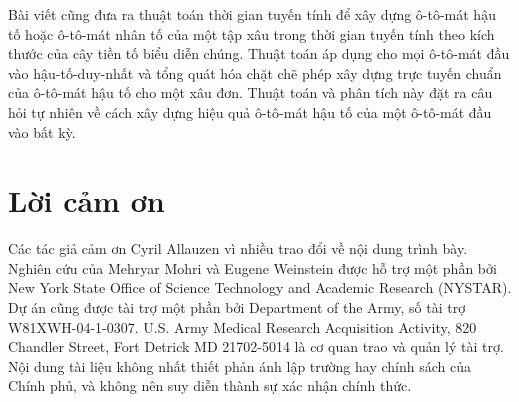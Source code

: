 \documentclass[11pt]{article}
\begin{document}
Bài viết cũng đưa ra thuật toán thời gian tuyến tính để xây dựng ô-tô-mát hậu
tố hoặc ô-tô-mát nhân tố của một tập xâu trong thời gian tuyến tính theo kích
thước của cây tiền tố biểu diễn chúng. Thuật toán áp dụng cho mọi ô-tô-mát đầu
vào hậu-tố-duy-nhất và tổng quát hóa chặt chẽ phép xây dựng trực tuyến chuẩn
của ô-tô-mát hậu tố cho một xâu đơn. Thuật toán và phân tích này đặt ra câu
hỏi tự nhiên về cách xây dựng hiệu quả ô-tô-mát hậu tố của một ô-tô-mát đầu
vào bất kỳ.

\section*{Lời cảm ơn}

Các tác giả cảm ơn Cyril Allauzen vì nhiều trao đổi về nội dung trình bày.
Nghiên cứu của Mehryar Mohri và Eugene Weinstein được hỗ trợ một phần bởi New
York State Office of Science Technology and Academic Research (NYSTAR). Dự án
cũng được tài trợ một phần bởi Department of the Army, số tài trợ
W81XWH-04-1-0307. U.S. Army Medical Research Acquisition Activity, 820 Chandler
Street, Fort Detrick MD 21702-5014 là cơ quan trao và quản lý tài trợ. Nội
dung tài liệu không nhất thiết phản ánh lập trường hay chính sách của Chính
phủ, và không nên suy diễn thành sự xác nhận chính thức.
\end{document}
